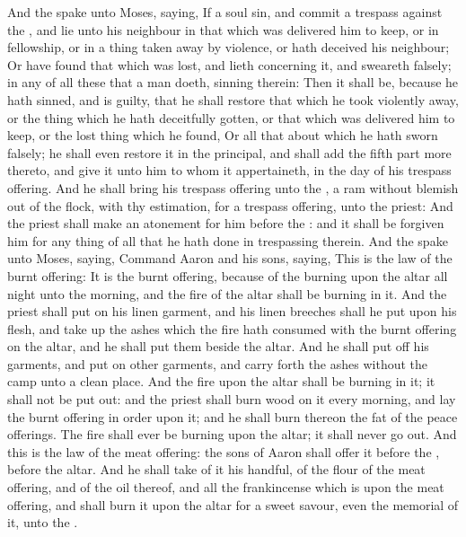 \begin{biblechapter} %
\verse And the \LORD spake unto Moses, saying,
\verse If a soul sin, and commit a trespass against the \LORD, and lie unto his neighbour in that which was delivered him to keep, or in fellowship, or in a thing taken away by violence, or hath deceived his neighbour;
\verse Or have found that which was lost, and lieth concerning it, and sweareth falsely; in any of all these that a man doeth, sinning therein:
\verse Then it shall be, because he hath sinned, and is guilty, that he shall restore that which he took violently away, or the thing which he hath deceitfully gotten, or that which was delivered him to keep, or the lost thing which he found,
\verse Or all that about which he hath sworn falsely; he shall even restore it in the principal, and shall add the fifth part more thereto, and give it unto him to whom it appertaineth, in the day of his trespass offering.
\verse And he shall bring his trespass offering unto the \LORD, a ram without blemish out of the flock, with thy estimation, for a trespass offering, unto the priest:
\verse And the priest shall make an atonement for him before the \LORD: and it shall be forgiven him for any thing of all that he hath done in trespassing therein.
 And the \LORD spake unto Moses, saying,
\verse Command Aaron and his sons, saying, This is the law of the burnt offering: It is the burnt offering, because of the burning upon the altar all night unto the morning, and the fire of the altar shall be burning in it.
\verse And the priest shall put on his linen garment, and his linen breeches shall he put upon his flesh, and take up the ashes which the fire hath consumed with the burnt offering on the altar, and he shall put them beside the altar.
\verse And he shall put off his garments, and put on other garments, and carry forth the ashes without the camp unto a clean place.
\verse And the fire upon the altar shall be burning in it; it shall not be put out: and the priest shall burn wood on it every morning, and lay the burnt offering in order upon it; and he shall burn thereon the fat of the peace offerings.
\verse The fire shall ever be burning upon the altar; it shall never go out.
 And this is the law of the meat offering: the sons of Aaron shall offer it before the \LORD, before the altar.
\verse And he shall take of it his handful, of the flour of the meat offering, and of the oil thereof, and all the frankincense which is upon the meat offering, and shall burn it upon the altar for a sweet savour, even the memorial of it, unto the \LORD.

\end{biblechapter}
